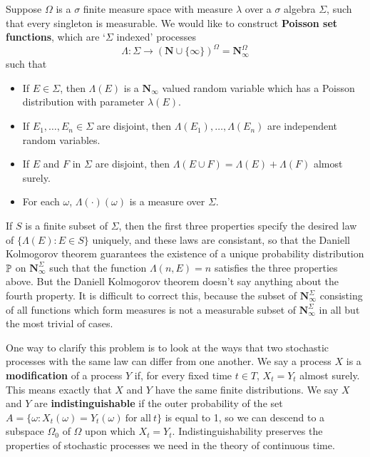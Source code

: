 \begin{example}
    Suppose $\Omega$ is a $\sigma$ finite measure space with measure $\lambda$ over a $\sigma$ algebra $\Sigma$, such that every singleton is measurable. We would like to construct {\bf Poisson set functions}, which are `$\Sigma$ indexed' processes
    \[ \Lambda: \Sigma \to (\mathbf{N} \cup \{ \infty \})^\Omega = \mathbf{N}_\infty^\Omega \]
    such that
    \begin{itemize}
        \item If $E \in \Sigma$, then $\Lambda(E)$ is a $\mathbf{N}_\infty$ valued random variable which has a Poisson distribution with parameter $\lambda(E)$.
        \item If $E_1, \dots, E_n \in \Sigma$ are disjoint, then $\Lambda(E_1), \dots, \Lambda(E_n)$ are independent random variables.
        \item If $E$ and $F$ in $\Sigma$ are disjoint, then $\Lambda(E \cup F) = \Lambda(E) + \Lambda(F)$ almost surely.
        \item For each $\omega$, $\Lambda(\cdot)(\omega)$ is a measure over $\Sigma$.
    \end{itemize}
    If $S$ is a finite subset of $\Sigma$, then the first three properties specify the desired law of $\{ \Lambda(E) : E \in S \}$ uniquely, and these laws are consistant, so that the Daniell Kolmogorov theorem guarantees the existence of a unique probability distribution $\operatorname{\mathbb{P}}$ on $\mathbf{N}_\infty^\Sigma$ such that the function $\Lambda(n,E) = n$ satisfies the three properties above. But the Daniell Kolmogorov theorem doesn't say anything about the fourth property. It is difficult to correct this, because the subset of $\mathbf{N}_\infty^\Sigma$ consisting of all functions which form measures is not a measurable subset of $\mathbf{N}_\infty^\Sigma$ in all but the most trivial of cases.
\end{example}

One way to clarify this problem is to look at the ways that two stochastic processes with the same law can differ from one another. We say a process $X$ is a {\bf modification} of a process $Y$ if, for every fixed time $t \in T$, $X_t = Y_t$ almost surely. This means exactly that $X$ and $Y$ have the same finite distributions. We say $X$ and $Y$ are {\bf indistinguishable} if the outer probability of the set $A = \{ \omega: X_t(\omega) = Y_t(\omega)\ \text{for all}\ t \}$ is equal to 1, so we can descend to a subspace $\Omega_0$ of $\Omega$ upon which $X_t = Y_t$. Indistinguishability preserves the properties of stochastic processes we need in the theory of continuous time.

